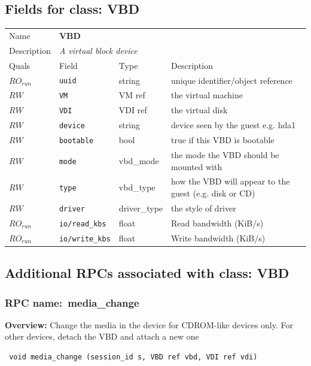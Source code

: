 \subsection{Fields for class: VBD}
\begin{longtable}{|lllp{}|}
\hline
\multicolumn{1}{|l}{Name} & \multicolumn{3}{l|}{\bf VBD} \\
\multicolumn{1}{|l}{Description} & \multicolumn{3}{l|}{\parbox{11cm}{\em A virtual block device}} \\
\hline
Quals & Field & Type & Description \\
\hline
$\mathit{RO}_\mathit{run}$ &  {\tt uuid} & string & unique identifier/object reference \\
$\mathit{RW}$ &  {\tt VM} & VM ref & the virtual machine \\
$\mathit{RW}$ &  {\tt VDI} & VDI ref & the virtual disk \\
$\mathit{RW}$ &  {\tt device} & string & device seen by the guest e.g. hda1 \\
$\mathit{RW}$ &  {\tt bootable} & bool & true if this VBD is bootable \\
$\mathit{RW}$ &  {\tt mode} & vbd\_mode & the mode the VBD should be mounted with \\
$\mathit{RW}$ &  {\tt type} & vbd\_type & how the VBD will appear to the guest (e.g. disk or CD) \\
$\mathit{RW}$ &  {\tt driver} & driver\_type & the style of driver \\
$\mathit{RO}_\mathit{run}$ &  {\tt io/read\_kbs} & float & Read bandwidth (KiB/s) \\
$\mathit{RO}_\mathit{run}$ &  {\tt io/write\_kbs} & float & Write bandwidth (KiB/s) \\
\hline
\end{longtable}
\subsection{Additional RPCs associated with class: VBD}
\subsubsection{RPC name:~media\_change}

{\bf Overview:} 
Change the media in the device for CDROM-like devices only. For other devices, detach the VBD and attach a new one

\begin{verbatim} void media_change (session_id s, VBD ref vbd, VDI ref vdi)\end{verbatim}


